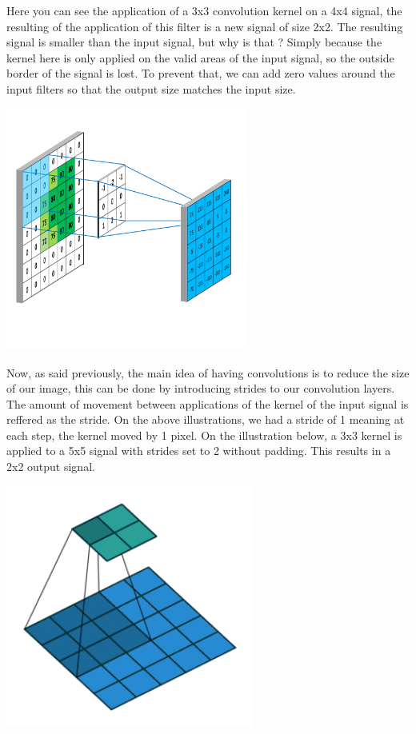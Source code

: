 \documentclass[12pt]{article}
\begin{document}
Here you can see the application of a 3x3 convolution kernel on a 4x4 signal, the resulting of the application of this filter is a new signal of size 2x2. The resulting signal is smaller than the input signal, but why is that ? Simply because the kernel here is only applied on the valid areas of the input signal, so the outside border of the signal is lost. To prevent that, we can add zero values around the input filters so that the output size matches the input size. \\

\centerline{\includegraphics[height=8cm]{../../docs/padding.png}}
\newpage

Now, as said previously, the main idea of having convolutions is to reduce the size of our image, this can be done by introducing strides to our convolution layers. The amount of movement between applications of the kernel of the input signal is reffered as the stride. On the above illustrations, we had a stride of 1 meaning at each step, the kernel moved by 1 pixel. On the illustration below, a 3x3 kernel is applied to a 5x5 signal with strides set to 2 without padding. This results in a 2x2 output signal.

\centerline{\includegraphics[height=8cm]{../../docs/strides.png}}
\end{document}
